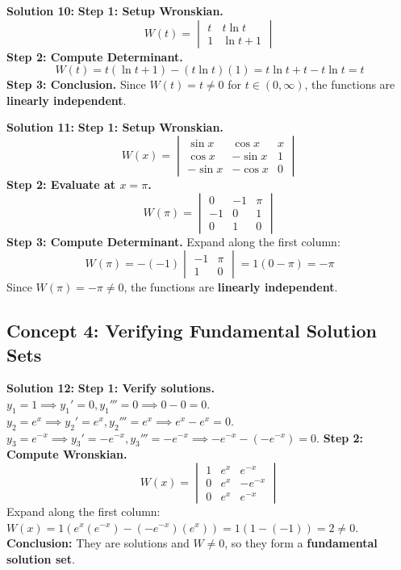 \documentclass[12pt]{article}
\begin{document}
\textbf{Solution 10:}
\textbf{Step 1: Setup Wronskian.}
$$W(t) = \begin{vmatrix} t & t\ln t \\ 1 & \ln t + 1 \end{vmatrix}$$
\textbf{Step 2: Compute Determinant.}
$$W(t) = t(\ln t + 1) - (t\ln t)(1) = t\ln t + t - t\ln t = t$$
\textbf{Step 3: Conclusion.} Since $W(t) = t \neq 0$ for $t \in (0, \infty)$, the functions are \textbf{linearly independent}.

\textbf{Solution 11:}
\textbf{Step 1: Setup Wronskian.}
$$W(x) = \begin{vmatrix} \sin x & \cos x & x \\ \cos x & -\sin x & 1 \\ -\sin x & -\cos x & 0 \end{vmatrix}$$
\textbf{Step 2: Evaluate at $x=\pi$.}
$$W(\pi) = \begin{vmatrix} 0 & -1 & \pi \\ -1 & 0 & 1 \\ 0 & 1 & 0 \end{vmatrix}$$
\textbf{Step 3: Compute Determinant.} Expand along the first column:
$$W(\pi) = -(-1) \begin{vmatrix} -1 & \pi \\ 1 & 0 \end{vmatrix} = 1(0 - \pi) = -\pi$$
Since $W(\pi) = -\pi \neq 0$, the functions are \textbf{linearly independent}.

\subsection*{Concept 4: Verifying Fundamental Solution Sets}

\textbf{Solution 12:}
\textbf{Step 1: Verify solutions.}
$y_1=1 \implies y_1'=0, y_1'''=0 \implies 0-0=0$.
$y_2=e^x \implies y_2'=e^x, y_2'''=e^x \implies e^x-e^x=0$.
$y_3=e^{-x} \implies y_3'=-e^{-x}, y_3'''=-e^{-x} \implies -e^{-x}-(-e^{-x})=0$.
\textbf{Step 2: Compute Wronskian.}
$$W(x) = \begin{vmatrix} 1 & e^x & e^{-x} \\ 0 & e^x & -e^{-x} \\ 0 & e^x & e^{-x} \end{vmatrix}$$
Expand along the first column: $W(x) = 1(e^x(e^{-x}) - (-e^{-x})(e^x)) = 1(1 - (-1)) = 2 \neq 0$.
\textbf{Conclusion:} They are solutions and $W \neq 0$, so they form a \textbf{fundamental solution set}.
\end{document}
